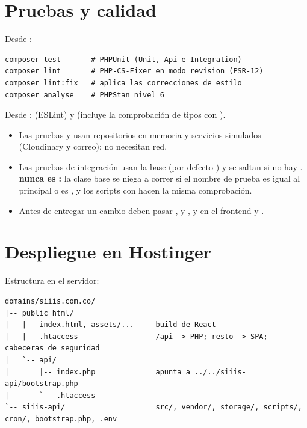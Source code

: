 \documentclass[11pt,a4paper]{article}
\begin{document}
\section{Pruebas y calidad}

Desde :
\begin{lstlisting}[style=powershell]
composer test       # PHPUnit (Unit, Api e Integration)
composer lint       # PHP-CS-Fixer en modo revision (PSR-12)
composer lint:fix   # aplica las correcciones de estilo
composer analyse    # PHPStan nivel 6
\end{lstlisting}

Desde :  (ESLint) y  (incluye la comprobaci\'on de tipos con
).

\begin{itemize}
  \item Las pruebas  y  usan repositorios en memoria y servicios simulados (Cloudinary y correo); no
    necesitan red.
  \item Las pruebas de integraci\'on usan la base  (por defecto ) y se saltan si
    no hay . \textbf{ nunca es :} la clase base se niega a correr si el nombre
    de prueba es igual al principal o es , y los scripts con  hacen la misma comprobaci\'on.
  \item Antes de entregar un cambio deben pasar ,  y , y en el
    frontend  y .
\end{itemize}

\section{Despliegue en Hostinger}\label{sec:despliegue}

Estructura en el servidor:
\begin{lstlisting}[style=texto]
domains/siiis.com.co/
|-- public_html/
|   |-- index.html, assets/...     build de React
|   |-- .htaccess                  /api -> PHP; resto -> SPA; cabeceras de seguridad
|   `-- api/
|       |-- index.php              apunta a ../../siiis-api/bootstrap.php
|       `-- .htaccess
`-- siiis-api/                     src/, vendor/, storage/, scripts/, cron/, bootstrap.php, .env
\end{lstlisting}
\end{document}
